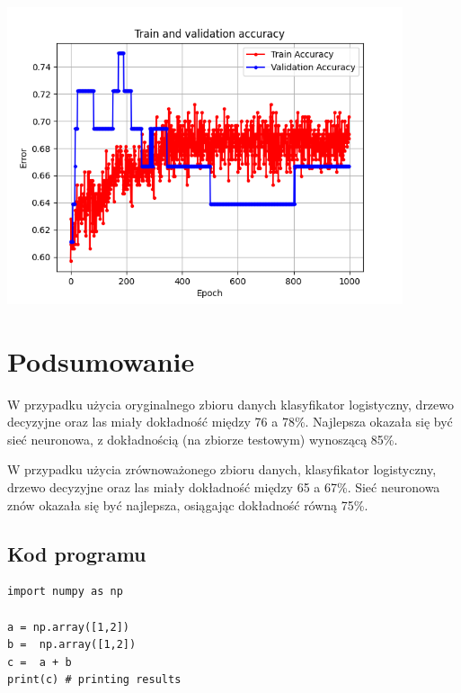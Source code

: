 \documentclass[11pt, a4paper, notitlepage]{report}
\begin{document}
\begin{center}
\includegraphics[width=330pt]{graphics/NeuralNetwork_2}

\end{center}

\chapter{Podsumowanie}
W przypadku użycia oryginalnego zbioru danych klasyfikator logistyczny, drzewo decyzyjne oraz las miały dokładność między 76 a 78\%.
Najlepsza okazała się być sieć neuronowa, z dokładnością (na zbiorze testowym) wynoszącą 85\%.

W przypadku użycia zrównoważonego zbioru danych, klasyfikator logistyczny, drzewo decyzyjne oraz las miały dokładność między 65 a 67\%.
Sieć neuronowa znów okazała się być najlepsza, osiągając dokładność równą 75\%.

\begin{appendices}
\chapter{Kod programu}
\begin{verbatim}
import numpy as np

a = np.array([1,2])
b =  np.array([1,2])
c =  a + b
print(c) # printing results
\end{verbatim}
\end{appendices}
\end{document}
